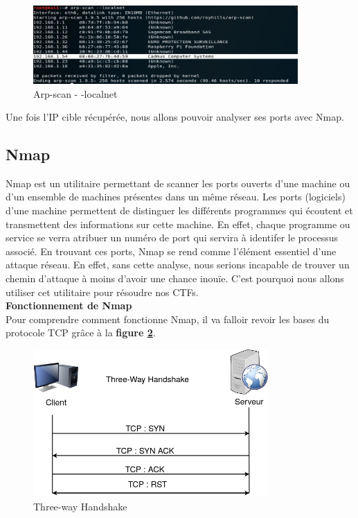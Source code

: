 \begin{figure}[htp!]
  \centering
  \setlength\figureheight{7cm}
  \setlength\figurewidth{9cm}
  \includegraphics[width=0.9\textwidth]{oui/images/Arpscan/unknown.png}
  \caption{Arp-scan  - -localnet}
  \label{fig:arpscanl}
\end{figure}

Une fois l'IP cible récupérée, nous allons pouvoir analyser ses ports avec Nmap.

\subsection{Nmap}

Nmap est un utilitaire permettant de scanner les ports ouverts d’une machine ou d’un ensemble de machines présentes dans un même réseau. Les ports (logiciels) d'une machine permettent de distinguer les différents programmes qui écoutent et transmettent des informations sur cette machine. En effet, chaque programme ou service se verra atribuer un numéro de port qui servira à identifer le processus associé. En trouvant ces ports, Nmap se rend comme l’élément essentiel d’une attaque réseau. En effet, sans cette analyse, nous serions incapable de trouver un chemin d’attaque à moins d’avoir une chance inouïe. C’est pourquoi nous allons utiliser cet utilitaire pour résoudre nos CTFs.\\

\noindent \textbf{Fonctionnement de Nmap}\\

Pour comprendre comment fonctionne Nmap, il va falloir revoir les bases du protocole TCP grâce à la \textbf{figure \ref{fig:3way}}.


\newpage

\begin{figure}[htp!]
  \centering
  \setlength\figureheight{7cm}
  \setlength\figurewidth{9cm}
  \includegraphics[width=0.8\textwidth]{oui/images/nmap/3way.png}
  \caption{Three-way Handshake}
  \label{fig:3way}
\end{figure}

